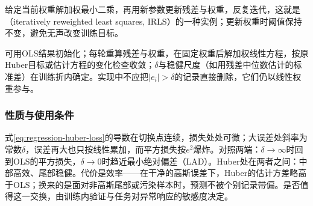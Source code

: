 给定当前权重解加权最小二乘，再用新参数更新残差与权重，反复迭代，这就是（iteratively reweighted least squares, IRLS）的一种实例；更新权重时阈值保持不变，避免无声改变训练目标。

可用OLS结果初始化；每轮重算残差与权重，在固定权重后解加权线性方程，按原Huber目标或估计方程的变化检查收敛；$\delta$与稳健尺度（如用残差中位数估计的标准差）在训练折内确定。实现中不应把$|e_i|>\delta$的记录直接删除，它们仍以线性权重参与。

\subsubsection{性质与使用条件}
\label{sec:regression-huber-theory}

式\eqref{eq:regression-huber-loss}的导数在切换点连续，损失处处可微；大误差处斜率为常数$\delta$，误差再大也只按线性累加，而平方损失按$e^2$爆炸。对照两端：$\delta\to\infty$时回到OLS的平方损失，$\delta\to0$时趋近最小绝对偏差（LAD）。Huber处在两者之间：中部高效、尾部稳健。代价是效率——在干净的高斯误差下，Huber的估计方差略高于OLS；换来的是面对非高斯尾部或污染样本时，预测不被个别记录带偏。是否值得这一交换，由训练内验证与任务对异常响应的敏感度决定。
